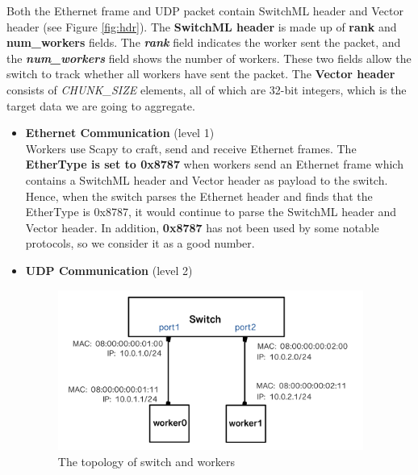 \documentclass[a4paper,11pt]{article}
\begin{document}
Both the Ethernet frame and UDP packet contain SwitchML header and Vector header (see Figure \ref{fig:hdr}). The \textbf{SwitchML header} is made up of \textbf{rank} and \textbf{num\_workers} fields. The \textbf{\textit{rank}} field indicates the worker sent the packet, and the \textit{\textbf{num\_workers}} field shows the number of workers. These two fields allow the switch to track whether all workers have sent the packet. The \textbf{Vector header} consists of \textit{CHUNK\_SIZE} elements, all of which are 32-bit integers, which is the target data we are going to aggregate.
\begin{itemize}
    \item \textbf{Ethernet Communication} (level 1) \\
    \label{level1comm}
    Workers use Scapy to craft, send and receive Ethernet frames. The \textbf{EtherType is set to 0x8787} when workers send an Ethernet frame which contains a SwitchML header and Vector header as payload to the switch. Hence, when the switch parses the Ethernet header and finds that the EtherType is 0x8787, it would continue to parse the SwitchML header and Vector header. In addition, \textbf{0x8787} has not been used by some notable protocols, so we consider it as a good number. 
    \item \textbf{UDP Communication} (level 2) \\
    \label{udpcmn}
    
    \begin{figure}[htbp]
        \centering
        \includegraphics[width=10cm]{udp_switch.jpeg}
        \caption{The topology of switch and workers}
        \label{fig:udpsw}
    \end{figure}
    

\end{itemize}
\end{document}
